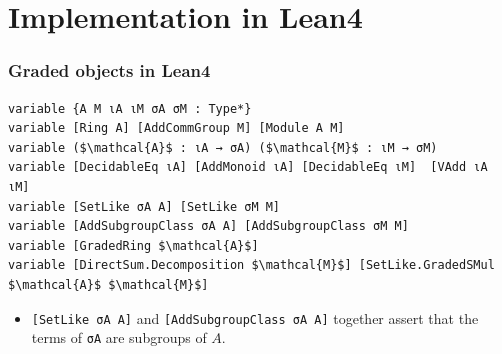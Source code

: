 \documentclass[9pt]{beamer}
\begin{document}
\section{Implementation in Lean4}
\begin{frame}[fragile]
\frametitle{Graded objects in Lean4}

\begin{lstlisting}[mathescape=true, extendedchars=true]
variable {A M ιA ιM σA σM : Type*} 
variable [Ring A] [AddCommGroup M] [Module A M]
variable ($\mathcal{A}$ : ιA → σA) ($\mathcal{M}$ : ιM → σM)
variable [DecidableEq ιA] [AddMonoid ιA] [DecidableEq ιM]  [VAdd ιA ιM]
variable [SetLike σA A] [SetLike σM M]
variable [AddSubgroupClass σA A] [AddSubgroupClass σM M] 
variable [GradedRing $\mathcal{A}$] 
variable [DirectSum.Decomposition $\mathcal{M}$] [SetLike.GradedSMul $\mathcal{A}$ $\mathcal{M}$]
\end{lstlisting}
\begin{itemize}
  \item \lstinline|[SetLike σA A]| and \lstinline|[AddSubgroupClass σA A]| together assert that the terms of \lstinline|σA| are subgroups of $A$.
\end{itemize}
\end{frame}
\end{document}
